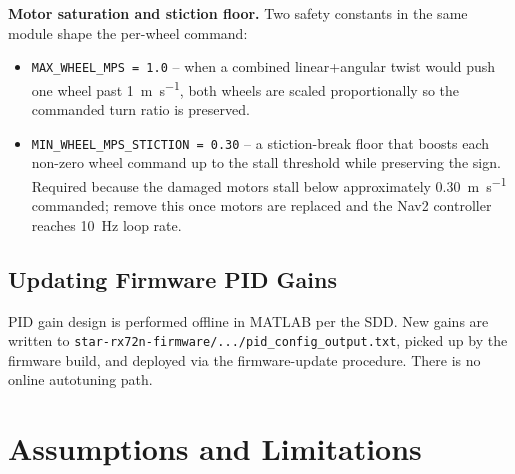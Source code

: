 \documentclass[11pt,letterpaper]{article}
\begin{document}
\textbf{Motor saturation and stiction floor.} Two safety
constants in the same module shape the per-wheel command:
\begin{itemize}[leftmargin=1.4em,itemsep=2pt]
\item \texttt{MAX\_WHEEL\_MPS = 1.0} -- when a combined
      linear+angular twist would push one wheel past
      \qty{1}{\meter\per\second}, both wheels are scaled
      proportionally so the commanded turn ratio is preserved.
\item \texttt{MIN\_WHEEL\_MPS\_STICTION = 0.30} -- a stiction-break
      floor that boosts each non-zero wheel command up to the
      stall threshold while preserving the sign. Required because
      the damaged motors stall below approximately
      \qty{0.30}{\meter\per\second} commanded; remove this once
      motors are replaced and the Nav2 controller reaches
      \qty{10}{\hertz} loop rate.
\end{itemize}

\subsection{Updating Firmware PID Gains}
PID gain design is performed offline in MATLAB per the SDD. New gains
are written to
\texttt{star-rx72n-firmware/.../pid\_config\_output.txt}, picked up
by the firmware build, and deployed via the firmware-update
procedure. There is no online autotuning path.

\section{Assumptions and Limitations}
\label{sec:limits}
\end{document}
